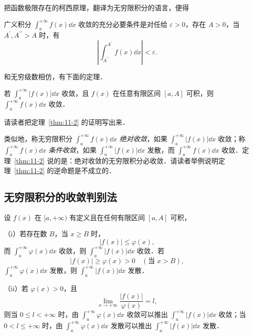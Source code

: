 把函数极限存在的柯西原理，翻译为无穷限积分的语言，便得

\begin{theorem}[无穷限积分的柯西收敛原理]\label{thm:11-1}
广义积分 $\displaystyle\int_{a}^{+\infty}f(x)\dd x$ 收敛的充分必要条件是对任给 $\varepsilon>0$，存在 $A>0$，当 $A^{\prime},A^{\prime\prime}>A$ 时，有
\[
\left|\int_{A^{\prime\prime}}^{A^{\prime}}f(x)\dd x\right|<\varepsilon.
\]
\end{theorem}

和无穷级数相仿，有下面的定理．

\begin{theorem}\label{thm:11-2}
若 $\displaystyle\int_{a}^{+\infty}\left|f(x)\right|\dd x$ 收敛，且 $f(x)$ 在任意有限区间 $[a,A]$ 可积，则 $\displaystyle\int_{a}^{+\infty}f(x)\dd x$ 收敛．
\end{theorem}

请读者把定理~\ref{thm:11-2} 的证明写出来．

类似地，称无穷限积分 $\displaystyle\int_{a}^{+\infty}f(x)\dd x$ \emph{绝对收敛}，如果 $\displaystyle\int_{a}^{+\infty}\left|f(x)\right|\dd x$ 收敛；称 $\displaystyle\int_{a}^{+\infty}f(x)\dd x$ \emph{条件收敛}，如果 $\displaystyle\int_{a}^{+\infty}\left|f(x)\right|\dd x$ 发散，而 $\displaystyle\int_{a}^{+\infty}f(x)\dd x$ 收敛．定理~\ref{thm:11-2} 说的是：绝对收敛的无穷限积分必收敛．请读者举例说明定理~\ref{thm:11-2} 的逆命题是不成立的．

\subsection{无穷限积分的收敛判别法}

\begin{theorem}[比较判别法]\label{thm:11-3}
设 $f(x)$ 在 $[a,+\infty)$ 有定义且在任何有限区间 $[a,A]$ 可积，

（i）若存在数 $B$，当 $x\geqslant B$ 时，
\[
\left|f(x)\right|\leqslant\varphi(x),
\]
而 $\displaystyle\int_{a}^{+\infty}\varphi(x)\dd x$ 收敛，则 $\displaystyle\int_{a}^{+\infty}\left|f(x)\right|\dd x$ 收敛．若
\[
\left|f(x)\right|\geqslant\varphi(x)>0\quad(\text{当 }x>B),
\]
$\displaystyle\int_{a}^{+\infty}\varphi(x)\dd x$ 发散，则 $\displaystyle\int_{a}^{+\infty}\left|f(x)\right|\dd x$ 发散．

（ii）若 $\varphi(x)>0$，且
\[
\lim_{x\to+\infty}\frac{\left|f(x)\right|}{\varphi(x)}=l,
\]
则当 $0\leqslant l<+\infty$ 时，由 $\displaystyle\int_{a}^{+\infty}\varphi(x)\dd x$ 收敛可以推出 $\displaystyle\int_{a}^{+\infty}\left|f(x)\right|\dd x$ 收敛；当 $0<l\leqslant+\infty$ 时，由 $\displaystyle\int_{a}^{+\infty}\varphi(x)\dd x$ 发散可以推出 $\displaystyle\int_{a}^{+\infty}\left|f(x)\right|\dd x$ 发散．
\end{theorem}

